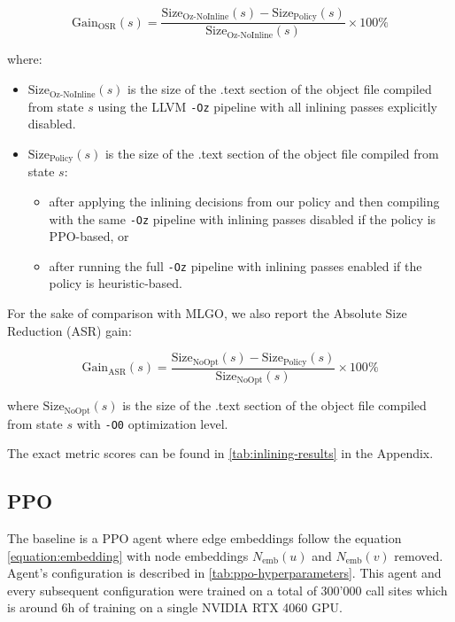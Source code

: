 \documentclass{article}
\theoremstyle{plain}
\theoremstyle{definition}
\theoremstyle{remark}
\begin{document}
\begin{equation}
\text{Gain}_{\text{OSR}}(s) = \frac{\text{Size}_{\text{Oz-NoInline}}(s) - \text{Size}_{\text{Policy}}(s)}{\text{Size}_{\text{Oz-NoInline}}(s)} \times 100\%
\end{equation}

where:

\begin{itemize}
    \item $\text{Size}_{\text{Oz-NoInline}}(s)$ is the size of the .text section of the object file compiled from state $s$ using the LLVM \verb|-Oz| pipeline with all inlining passes explicitly disabled.
    \item $\text{Size}_{\text{Policy}}(s)$ is the size of the .text section of the object file compiled from state $s$:
    \begin{itemize}
        \item after applying the inlining decisions from our policy and then compiling with the same \verb|-Oz| pipeline with inlining passes disabled if the policy is PPO-based, or
        \item after running the full \verb|-Oz| pipeline with inlining passes enabled if the policy is heuristic-based.
    \end{itemize} 
\end{itemize}

For the sake of comparison with MLGO, we also report the Absolute Size Reduction (ASR) gain:

\begin{equation}
\text{Gain}_{\text{ASR}}(s) = \frac{\text{Size}_{\text{NoOpt}}(s) - \text{Size}_{\text{Policy}}(s)}{\text{Size}_{\text{NoOpt}}(s)} \times 100\%
\end{equation}

where $\text{Size}_{\text{NoOpt}}(s)$ is the size of the .text section of the object file compiled from state $s$ with \verb|-O0| optimization level.

The exact metric scores can be found in \cref{tab:inlining-results} in the Appendix.

\subsection{PPO}

The baseline is a PPO agent where edge embeddings follow the equation \ref{equation:embedding} with node embeddings $N_{\text{emb}}(u)$ and $N_{\text{emb}}(v)$ removed. Agent's configuration is described in \cref{tab:ppo-hyperparameters}. This agent and every subsequent configuration were trained on a total of 300'000 call sites which is around 6h of training on a single NVIDIA RTX 4060 GPU.
\end{document}
